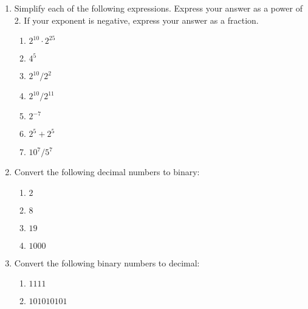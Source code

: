 \documentclass{article}
\begin{document}
\begin{enumerate}
\item Simplify each of the following expressions. Express your answer as a power of 2. If your exponent is negative, express your answer as a fraction.
\begin{enumerate}
\item $2^{10}\cdot 2^{25}$

\vfill

\item $4^5$

\vfill

\item $2^{10}/ 2^2$

\vfill

\item $2^{10}/ 2^{11}$

\vfill

\item $2^{-7}$

\vfill

\item $2^5+2^5$

\vfill

\item $10^7/5^7$

\vfill

\end{enumerate}

\newpage

\item Convert the following decimal numbers to binary:
\begin{enumerate}
\item $2$

\vfill

\item $8$

\vfill

\item $19$

\vfill

\item $1000$

\vfill

\end{enumerate}

\item Convert the following binary numbers to decimal:
\begin{enumerate}
\item $1111$

\vfill

\item $101010101$


\end{enumerate}
\end{enumerate}
\end{document}
